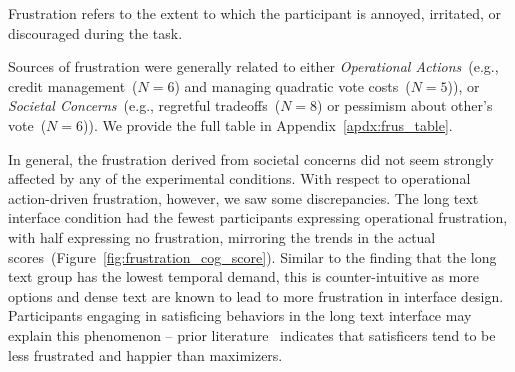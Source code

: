 Frustration refers to the extent to which the participant is annoyed, irritated, or discouraged during the task. 

Sources of frustration were generally related to either \textit{Operational Actions}~(e.g., credit management~($N=6$) and managing quadratic vote costs~($N=5$)), or \textit{Societal Concerns}~(e.g., regretful tradeoffs~($N=8$) or  pessimism about other's vote~($N=6$)). We provide the full table in Appendix~\ref{apdx:frus_table}.

In general, the frustration derived from societal concerns did not seem strongly affected by any of the experimental conditions. With respect to operational action-driven frustration, however, we saw some discrepancies. The long text interface condition had the fewest participants expressing operational frustration, with half expressing no frustration, mirroring the trends in the actual scores~(Figure~\ref{fig:frustration_cog_score}). Similar to the finding that the long text group has the lowest temporal demand, this is counter-intuitive as more options and dense text are known to lead to more frustration in interface design. Participants engaging in satisficing behaviors in the long text interface may explain this phenomenon -- prior literature~\cite{polmanWhyAreMaximizers2010, schwartzMaximizingSatisficingHappiness2002} indicates that satisficers tend to be less frustrated and happier than maximizers. 

